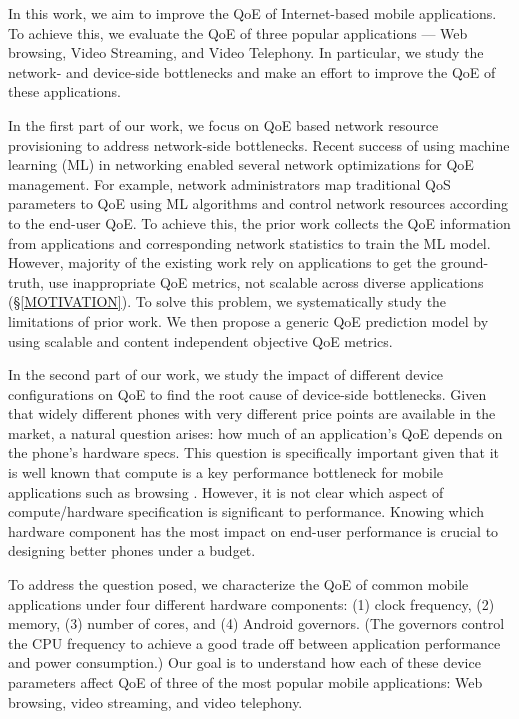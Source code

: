 In this work, we aim to improve the QoE of Internet-based mobile applications.
To achieve this, we evaluate the QoE of three popular applications --- Web browsing, Video Streaming, and Video Telephony. 
In particular, we study the network- and device-side bottlenecks and make an effort to improve the QoE of these applications.

In the first part of our work, we focus on QoE based network resource provisioning to address network-side bottlenecks.
Recent success of using machine learning (ML) in networking enabled several network optimizations for QoE management.
For example, network administrators map traditional QoS parameters to QoE using ML algorithms and control network resources according to the end-user QoE. 
To achieve this, the prior work collects the QoE information from applications and corresponding network statistics to train the ML model. 
However, majority of the existing work rely on applications to get the ground-truth, use inappropriate QoE metrics, not scalable across diverse applications (\S\ref{MOTIVATION}).
To solve this problem, we systematically study the limitations of prior work. We then propose a generic QoE prediction model by using scalable and content independent objective QoE metrics.

In the second part of our work, we study the impact of different device configurations on QoE to find the root cause of device-side bottlenecks.
Given that widely different phones with very different price points are available in the market, a natural question arises: how much of an application's QoE depends on the phone's hardware specs.
This question is specifically important given that it is well known that compute is a key performance bottleneck for mobile applications such as browsing \cite{nejati2016depth}. However, it is not clear which aspect of compute/hardware specification is significant to performance. Knowing which hardware component has the most impact on end-user performance is crucial to designing better phones under a budget.

To address the question posed, we characterize the QoE of common mobile applications under four different hardware components: (1) clock frequency, (2) memory, (3) number of cores, and (4) Android governors. (The governors control the CPU frequency to achieve a good trade off between application performance and power consumption.) Our goal is to understand how each of these device parameters affect QoE of three of the most popular mobile applications: Web browsing, video streaming, and video telephony.


